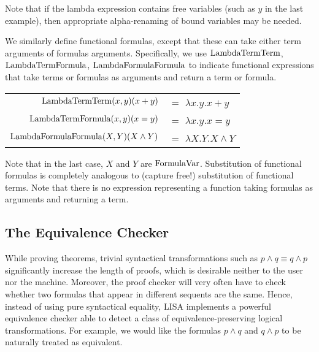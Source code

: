 Note that if the lambda expression contains free variables (such as $y$ in the last example), then appropriate alpha-renaming of bound variables may be needed.

We similarly define functional formulas, except that these can take either term arguments of formulas arguments. Specifically, we use $\operatorname{LambdaTermTerm}$, $\operatorname{LambdaTermFormula}$, $\operatorname{LambdaFormulaFormula}$ to indicate functional expressions that take terms or formulas as arguments and return a term or formula.

\begin{ex}
  \begin{center}
    \begin{tabular}{|r l|}
      \hline
      \rule{0em}{1.3em}
      $\operatorname{LambdaTermTerm}(x, y)(x+y)$                               & $=$ $\lambda x.y. x+y$               \\
      $\operatorname{LambdaTermFormula}(x, y)(x=y)$                               & $=$ $\lambda x.y. x=y$               \\
      $\operatorname{LambdaFormulaFormula}(X, Y)(X \land Y)$ & $=$ $\lambda X.Y. X \land Y$
      \rule[-1em]{0em}{0em}                                                                                 \\
      \hline
    \end{tabular}
  \end{center}

\end{ex}

Note that in the last case, $X$ and $Y$ are $\operatorname{FormulaVar}$. Substitution of functional formulas is completely analogous to (capture free!) substitution of functional terms. Note that there is no expression representing a function taking formulas as arguments and returning a term.

\subsection{The Equivalence Checker}
\label{subsec:equivalencechecker}

While proving theorems, trivial syntactical transformations such as $p\land q \equiv q\land p$ significantly increase the length of proofs, which is desirable neither to the user nor the machine. Moreover, the proof checker will very often have to check whether two formulas that appear in different sequents are the same. Hence, instead of using pure syntactical equality, LISA implements a powerful equivalence checker able to detect a class of equivalence-preserving logical transformations. For example, we would like the  formulas $p\land q$ and $q\land p$ to be naturally treated as equivalent.

